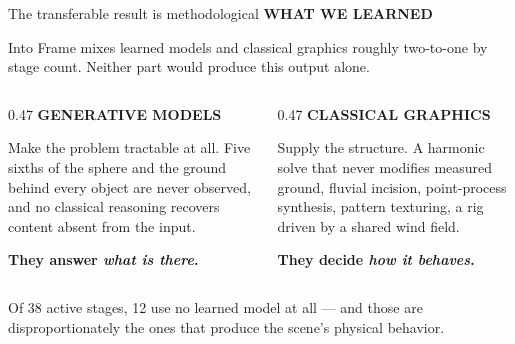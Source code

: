 \documentclass[aspectratio=169,11pt]{beamer}
\newcommand{\kicker}[1]{{\color{accent}\bfseries\scriptsize\MakeUppercase{#1}}\par\vspace{0.2em}}
\newcommand{\lead}[1]{{\color{ink}\bfseries #1}}
\begin{document}
\begin{frame}{The transferable result is methodological}
  \kicker{what we learned}
  \small
  Into Frame mixes learned models and classical graphics roughly two-to-one by
  stage count. Neither part would produce this output alone.
  \vspace{0.9em}
  \begin{columns}[T]
    \begin{column}{0.47\textwidth}
      {\color{accent}\bfseries\scriptsize GENERATIVE MODELS}\par\vspace{0.35em}
      \scriptsize Make the problem tractable at all. Five sixths of the sphere and
      the ground behind every object are never observed, and no classical reasoning
      recovers content absent from the input.\par\vspace{0.5em}
      \lead{They answer \emph{what is there}.}
    \end{column}
    \begin{column}{0.47\textwidth}
      {\color{accent}\bfseries\scriptsize CLASSICAL GRAPHICS}\par\vspace{0.35em}
      \scriptsize Supply the structure. A harmonic solve that never modifies
      measured ground, fluvial incision, point-process synthesis, pattern
      texturing, a rig driven by a shared wind field.\par\vspace{0.5em}
      \lead{They decide \emph{how it behaves}.}
    \end{column}
  \end{columns}
  \vspace{1.1em}
  \par\footnotesize\color{muted}
  Of 38 active stages, 12 use no learned model at all --- and those are
  disproportionately the ones that produce the scene's physical behavior.
\end{frame}
\end{document}
